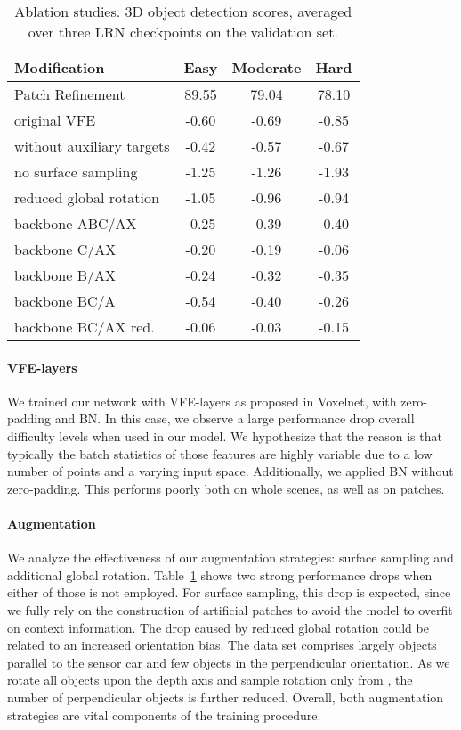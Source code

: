 \documentclass{article}
\begin{document}
\begin{table}[ht]
\begin{center}
\begin{tabular}{l|c|c|c}
\hline
Modification & Easy & Moderate & Hard \\
\hline\hline
Patch Refinement & 89.55 & 79.04 & 78.10  \\
\hline\hline
original VFE & -0.60 & -0.69 & -0.85 \\
without auxiliary targets & -0.42 & -0.57 & -0.67 \\	
\hline
no surface sampling & -1.25 & -1.26 & -1.93 \\
reduced global rotation & -1.05 & -0.96 & -0.94 \\
\hline
backbone ABC/AX & -0.25 & -0.39 & -0.40\\
backbone C/AX & -0.20 & -0.19 & -0.06\\
backbone B/AX  & -0.24 & -0.32 & -0.35 \\
backbone BC/A & -0.54 & -0.40 & -0.26\\
backbone BC/AX red. & -0.06 & -0.03 & -0.15 \\
\hline
\end{tabular}
\end{center}
\caption{Ablation studies. 3D object detection scores, averaged over three LRN checkpoints on the validation set.}
\label{tab:ablations}
\end{table}

\paragraph{VFE-layers}
We trained our network with VFE-layers as proposed in Voxelnet, with zero-padding and BN. In this case, we observe a large performance drop overall difficulty levels when used in our model. We hypothesize that the reason is that typically
the batch statistics of those features are highly variable due to a low number of points and a varying input space. 
Additionally, we applied BN without zero-padding. This performs poorly both on whole scenes, as well as on patches.

\paragraph{Augmentation}
We analyze the effectiveness of our augmentation strategies: 
surface sampling and additional global rotation. 
Table~\ref{tab:ablations} shows two strong performance drops when
either of those is not employed. 
For surface sampling, this drop is expected, since we fully rely on the construction of artificial patches to avoid the model to overfit on context information.
The drop caused by reduced global rotation could be related to
an increased orientation bias. The data set comprises largely objects parallel to the sensor car and few objects in the perpendicular
orientation. As we rotate all objects
upon the depth axis and sample rotation only from ,
the number of perpendicular objects is further reduced. 
Overall, both augmentation strategies are vital components of the
training procedure. 
\end{document}
